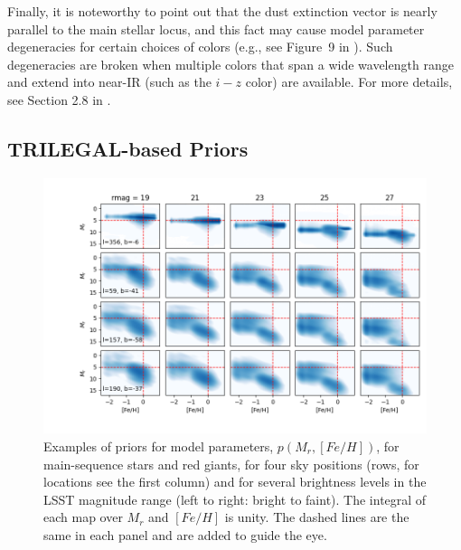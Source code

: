 Finally, it is noteworthy to point out that the dust extinction vector is nearly parallel to the main stellar locus,
and this fact may cause model parameter degeneracies for certain choices of colors (e.g., see Figure~9 in
\citealt{2012ApJ...757..166B}). Such degeneracies are broken when multiple colors that span a wide
wavelength range and extend into near-IR (such as the $i-z$ color) are available. For more details, see
Section 2.8 in \cite{2012ApJ...757..166B}.


\subsection{TRILEGAL-based Priors} 

\begin{figure}[t!]
\hskip -0.5in
\includegraphics[width=1.07\textwidth,angle=0]{figures/Stripe82priorMosaic.png}
\vskip -0.4in  
\caption{Examples of priors for model parameters, $p(M_r, [Fe/H])$, for main-sequence stars and red giants,
  for four sky positions (rows, for locations see the first column) and for several brightness levels in the LSST
  magnitude range (left to right: bright to faint). The integral of each map over $M_r$ and $[Fe/H]$ is unity. 
  The dashed lines are the same in each panel and are added to guide the eye. 
}
\label{fig:priorsAstroLab}
\end{figure}


